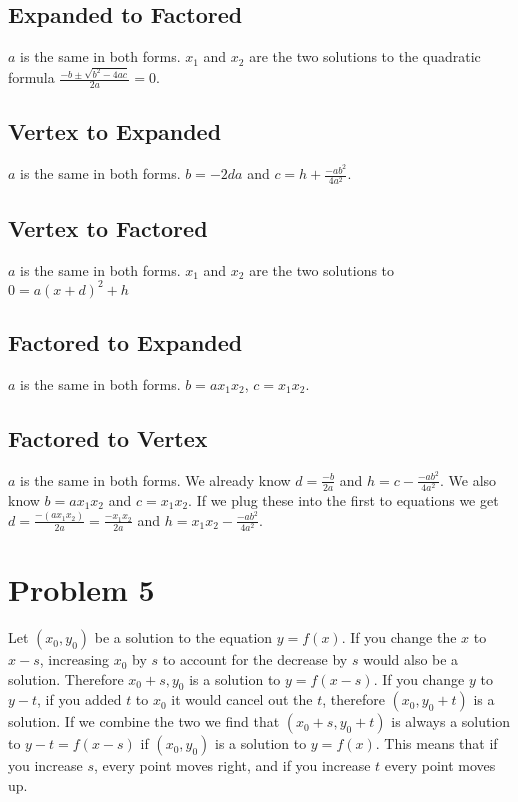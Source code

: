 \documentclass[12pt, letterpaper, twoside]{article}
\begin{document}
\subsection{Expanded to Factored}
$a$ is the same in both forms. $x_1$ and $x_2$ are the two solutions to the quadratic formula $\frac{-b \pm \sqrt{b^2-4ac}}{2a} = 0$.
\subsection{Vertex to Expanded}
$a$ is the same in both forms. $b = -2da$ and $c = h+ \frac{-ab^2}{4a^2}$.
\subsection{Vertex to Factored}
$a$ is the same in both forms. $x_1$ and $x_2$ are the two solutions to $0 = a(x+d)^2 + h$
\subsection{Factored to Expanded}
$a$ is the same in both forms. $b = ax_1x_2$, $c = x_1x_2$.
\subsection{Factored to Vertex}
$a$ is the same in both forms. We already know $d = \frac{-b}{2a}$ and $h = c-\frac{-ab^2}{4a^2}$. We also know $b = ax_1x_2$ and $c = x_1x_2$. If we plug these into the first to equations we get $d = \frac{-(ax_1x_2)}{2a} = \frac{-x_1x_2}{2a}$ and $h = x_1x_2 - \frac{-ab^2}{4a^2}$.
\section{Problem 5}
Let $(x_0,y_0)$ be a solution to the equation $y = f(x)$. If you change the $x$ to $x-s$, increasing $x_0$ by $s$ to account for the decrease by $s$ would also be a solution. Therefore $x_0 + s, y_0$ is a solution to $y = f(x-s)$. If you change $y$ to $y-t$, if you added $t$ to $x_0$ it would cancel out the $t$, therefore $(x_0, y_0 + t)$ is a solution. If we combine the two we find that $(x_0 + s, y_0 + t)$ is always a solution to $y-t =  f(x-s)$ if $(x_0,y_0)$ is a solution to $y = f(x)$. This means that if you increase $s$, every point moves right, and if you increase $t$ every point moves up.
\end{document}

